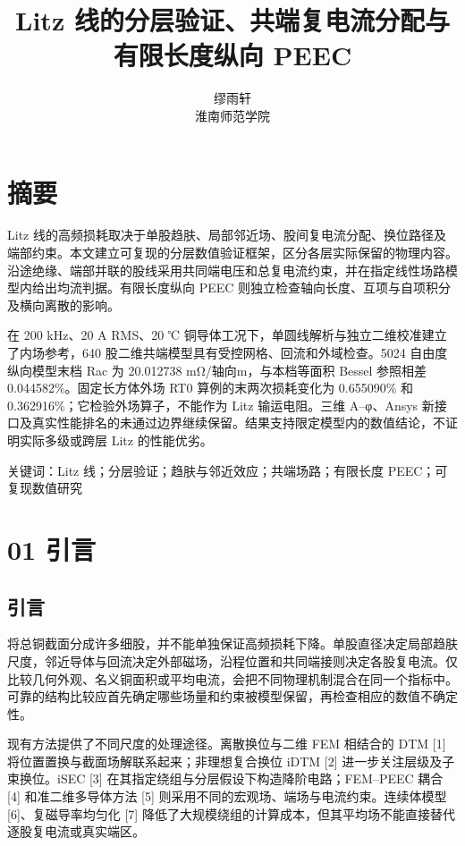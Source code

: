 \documentclass[11pt]{article}
\begin{document}
\title{Litz 线的分层验证、共端复电流分配与有限长度纵向 PEEC}
\author{缪雨轩\\淮南师范学院}
\date{}
\maketitle
\FloatBarrier
\section*{摘要}
\hypertarget{abstract}{}
Litz 线的高频损耗取决于单股趋肤、局部邻近场、股间复电流分配、换位路径及端部约束。本文建立可复现的分层数值验证框架，区分各层实际保留的物理内容。沿途绝缘、端部并联的股线采用共同端电压和总复电流约束，并在指定线性场路模型内给出均流判据。有限长度纵向 PEEC 则独立检查轴向长度、互项与自项积分及横向离散的影响。

在 200 kHz、20 A RMS、20 ℃ 铜导体工况下，单圆线解析与独立二维校准建立了内场参考，640 股二维共端模型具有受控网格、回流和外域检查。5024 自由度纵向模型末档 Rac 为 20.012738 mΩ/轴向m，与本档等面积 Bessel 参照相差 0.044582\%。固定长方体外场 RT0 算例的末两次损耗变化为 0.655090\% 和 0.362916\%；它检验外场算子，不能作为 Litz 输运电阻。三维 A–φ、Ansys 新接口及真实性能排名的未通过边界继续保留。结果支持限定模型内的数值结论，不证明实际多级或跨层 Litz 的性能优劣。


关键词：Litz 线；分层验证；趋肤与邻近效应；共端场路；有限长度 PEEC；可复现数值研究


\FloatBarrier
\section*{01 引言}
\hypertarget{chapter-01}{}
\subsection*{引言}
\hypertarget{01.introduction.heading}{}
将总铜截面分成许多细股，并不能单独保证高频损耗下降。单股直径决定局部趋肤尺度，邻近导体与回流决定外部磁场，沿程位置和共同端接则决定各股复电流。仅比较几何外观、名义铜面积或平均电流，会把不同物理机制混合在同一个指标中。可靠的结构比较应首先确定哪些场量和约束被模型保留，再检查相应的数值不确定性。


现有方法提供了不同尺度的处理途径。离散换位与二维 FEM 相结合的 DTM [1] 将位置置换与截面场解联系起来；非理想复合换位 iDTM [2] 进一步关注层级及子束换位。iSEC [3] 在其指定绕组与分层假设下构造降阶电路；FEM–PEEC 耦合 [4] 和准二维多导体方法 [5] 则采用不同的宏观场、端场与电流约束。连续体模型 [6]、复磁导率均匀化 [7] 降低了大规模绕组的计算成本，但其平均场不能直接替代逐股复电流或真实端区。
\end{document}

